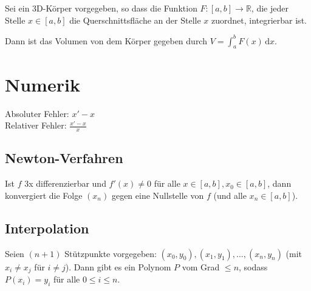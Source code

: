 \documentclass{mg2}
\begin{document}
 \begin{satz}[Volumenbestimmung]
 Sei ein 3D-Körper vorgegeben, so dass die Funktion $F: [a,b] \to \mathbb{R}$, die jeder Stelle $x \in [a,b]$ die Querschnittsfläche an der Stelle $x$ zuordnet, integrierbar ist.
 
 Dann ist das Volumen von dem Körper gegeben durch $V = \int_a^b \! F(x) \, \mathrm{d}x$.
 \end{satz}
 
\section{Numerik}
Absoluter Fehler: $x' - x$\\
Relativer Fehler: $\frac{x'-x}{x}$\\
\subsection{Newton-Verfahren}
\begin{satz}
Ist $f$ 3x differenzierbar und $f'(x) \neq 0$ für alle $x \in [a,b], x_0 \in [a,b]$, dann konvergiert die Folge $(x_n)$ gegen eine Nullstelle von $f$ (und alle $x_n \in [a,b]$).
\end{satz}
\subsection{Interpolation}
\begin{satz}[Interpolation]
Seien $(n+1)$ Stützpunkte vorgegeben: $(x_0,y_0), (x_1,y_1), ..., (x_n,y_n)$ (mit $x_i \neq x_j$ für $i \neq j$). Dann gibt es ein Polynom $P$ vom Grad $\leq n$, sodass $P(x_i) = y_i$ für alle $0 \leq i \leq n$.
\end{satz}
\end{document}
